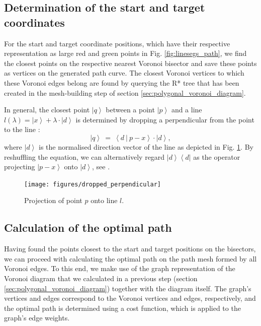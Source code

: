 \subsection{Determination of the start and target coordinates}
\label{sec:startend}

For the start and target coordinate positions, which have their respective 
representation as large red and green points in Fig. \ref{fig:linesegs_path}, 
we find the closest points on the respective nearest Voronoi bisector and save 
these points as vertices on the generated path curve.
The closest Voronoi vertices to which these Voronoi edges belong are found by 
querying the R* tree that has been created in the mesh-building step of section
\ref{sec:polygonal_voronoi_diagram}.

In general, the closest point $\left|q\right>$ between a point $\left|p\right>$ 
and a line $l\left(\lambda\right) = \left|x\right> + \lambda \cdot \left|d\right>$ 
is determined by dropping a perpendicular from the point to the line \cite{wiki_proj}:
\begin{equation}
	\left|q\right> \ =\  \left<d  \ |\  p - x \right> \cdot \left|d\right>,
\end{equation}
where $\left|d\right>$ is the normalised direction vector of the line as depicted 
in Fig. \ref{fig:dropped_perpendicular}.
By reshuffling the equation, we can alternatively regard $\left|d\right> \left<d\right|$
as the operator projecting $\left| p - x \right>$ onto $\left|d\right>$, see \cite[p. 814]{Arens2015}.

\begin{figure}[htb]
	\begin{center}
		\texttt{[image: figures/dropped\_perpendicular]}
	\end{center}
	\caption[Projection of a point onto a line.]{Projection of point $p$ onto line $l$.
		\label{fig:dropped_perpendicular}}
\end{figure}



\subsection{Calculation of the optimal path}
\label{sec:optimalpath}

Having found the points closest to the start and target positions on the bisectors, we can
proceed with calculating the optimal path on the path mesh formed by all Voronoi edges.
To this end, we make use of the graph representation of the Voronoi diagram that we calculated
in a previous step (section \ref{sec:polygonal_voronoi_diagram}) together with the diagram itself.
The graph's vertices and edges correspond to the Voronoi vertices and edges, respectively,
and the optimal path is determined using a cost function, which is applied to the graph's edge weights.

